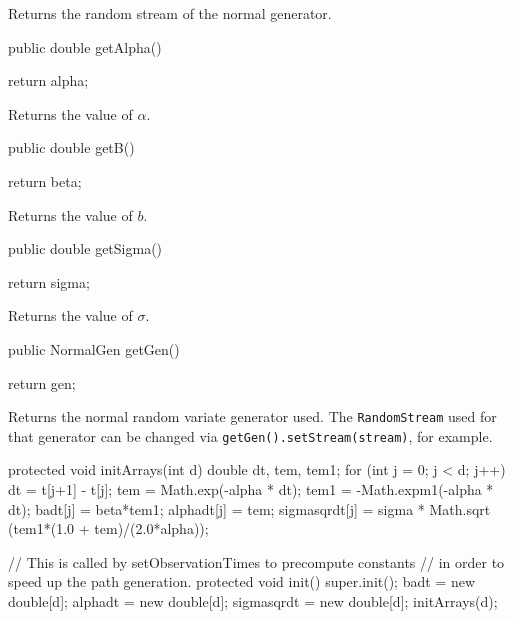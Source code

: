 \begin{tabb} 
Returns the random stream of the normal generator.
\end{tabb}
\begin{code}

   public double getAlpha() \begin{hide} { return alpha; }\end{hide}
\end{code}
\begin{tabb} 
Returns the value of $\alpha$.
\end{tabb}
\begin{code}

   public double getB() \begin{hide} { return beta; }\end{hide}
\end{code}
\begin{tabb} 
Returns the value of $b$.
\end{tabb}
\begin{code}

   public double getSigma() \begin{hide} { return sigma; }\end{hide}
\end{code}
\begin{tabb} 
Returns the value of $\sigma$.
\end{tabb}
\begin{code}

   public NormalGen getGen() \begin{hide} { return gen; }\end{hide}
\end{code}
\begin{tabb} 
Returns the normal random variate generator used.
The \texttt{RandomStream} used for that generator can be changed via 
\texttt{getGen().setStream(stream)}, for example.
\end{tabb}
\begin{code} \begin{hide}

   protected void initArrays(int d) {
      double dt, tem, tem1;
      for (int j = 0; j < d; j++) {
         dt = t[j+1] - t[j];
         tem = Math.exp(-alpha * dt);
         tem1 = -Math.expm1(-alpha * dt);
         badt[j] = beta*tem1;
         alphadt[j] = tem;
         sigmasqrdt[j] = sigma * Math.sqrt (tem1*(1.0 + tem)/(2.0*alpha));
      }
   }

    // This is called by setObservationTimes to precompute constants
    // in order to speed up the path generation.
    protected void init() {
        super.init();
        badt = new double[d];
        alphadt = new double[d];
        sigmasqrdt = new double[d];
        initArrays(d);
     }\end{hide}
\end{code}
\begin{code}\begin{hide}
} \end{hide}
\end{code}
